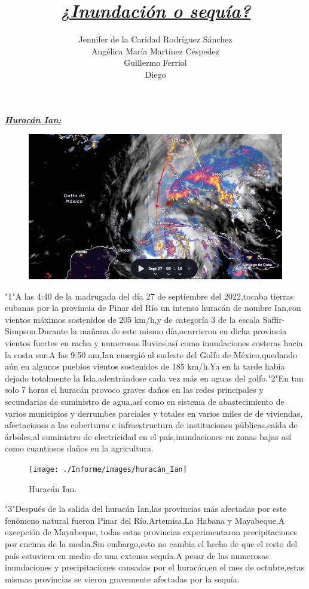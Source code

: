 \documentclass[12pt]{article}
\title{\textbf{\textit{\underline{¿Inundación o sequía?}}}}
\author{Jennifer de la Caridad Rodríguez Sánchez\\
        Angélica María Martínez Céspedez\\
        Guillermo Ferriol\\
        Diego\\}
\begin{document}
\begin{center}
	\textbf{\textit{\underline{{\fontsize{60}{24}\selectfont Huracán Ian:}}}}
\end{center}


\begin{figure}[H]
	\centering
	\includegraphics[width=0.7\linewidth]{./Informe/images/Ian}
	\label{fig:ian}
\end{figure}

 
"1"A las 4:40 de la madrugada del día 27 de septiembre del 2022,tocaba tierras cubanas por la provincia de Pinar del Río un intenso huracán de nombre Ian,con vientos máximos sostenidos de 205 km/h,y de categoría 3 de la escala Saffir-Simpson.Durante la mañana de este mismo día,ocurrieron en dicha provincia vientos fuertes en racha y numerosas lluvias,así como inundaciones costeras hacia la costa sur.A las 9:50 am,Ian emergió al sudeste del Golfo de México,quedando aún en algunos pueblos vientos sostenidos de 185 km/h.Ya en la tarde había dejado totalmente la Isla,adentrándose cada vez más en aguas del golfo."2"En tan solo 7 horas el huracán provoco graves daños en las redes principales y secundarias de suministro de agua,así como en sistema de abastecimiento de varios municipios y derrumbes parciales y totales en varios miles de de viviendas, afectaciones a las coberturas e infraestructura de instituciones públicas,caída de árboles,al suministro de electricidad en el país,inundaciones en zonas bajas así como cuantiosos daños en la agricultura.


\begin{figure}[H]
	\centering
	\texttt{[image: ./Informe/images/huracán\_Ian]}
	\caption{Huracán Ian.}
	\label{fig:huracanian}
\end{figure}


"3"Después de la salida del huracán Ian,las provincias más afectadas por este fenómeno natural fueron Pinar del Río,Artemisa,La Habana y Mayabeque.A excepción de Mayabeque, todas estas provincias experimentaron precipitaciones por encima de la media.Sin embargo,esto no cambia el hecho de que el resto del país estuviera en medio de una extensa sequía.A pesar de las numerosas inundaciones y precipitaciones causadas por el huracán,en el mes de octubre,estas mismas provincias se vieron gravemente afectadas por la sequía.
\end{document}
